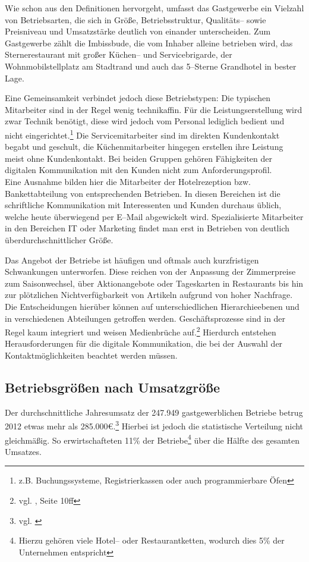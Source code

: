 Wie schon aus den Definitionen hervorgeht, umfasst das Gastgewerbe ein Vielzahl von Betriebsarten, die sich in Größe, Betriebsstruktur, Qualitäts– sowie Preisniveau und Umsatzstärke deutlich von einander unterscheiden. Zum Gastgewerbe zählt die Imbissbude, die vom Inhaber alleine betrieben wird, das Sternerestaurant mit großer Küchen– und Servicebrigarde, der Wohnmobilstellplatz am Stadtrand und auch das 5–Sterne Grandhotel in bester Lage.

Eine Gemeinsamkeit verbindet jedoch diese Betriebstypen: Die typischen Mitarbeiter sind in der Regel wenig technikaffin. Für die Leistungserstellung wird zwar Technik benötigt, diese wird jedoch vom Personal lediglich bedient und nicht eingerichtet.\footnote{z.B. Buchungssysteme, Registrierkassen oder auch programmierbare Öfen} Die Servicemitarbeiter sind im direkten Kundenkontakt begabt und geschult, die Küchenmitarbeiter hingegen erstellen ihre Leistung meist ohne Kundenkontakt. Bei beiden Gruppen gehören Fähigkeiten der digitalen Kommunikation mit den Kunden nicht zum Anforderungsprofil.\\
Eine Ausnahme bilden hier die Mitarbeiter der Hotelrezeption bzw. Bankettabteilung von entsprechenden Betrieben. In diesen Bereichen ist die schriftliche Kommunikation mit Interessenten und Kunden durchaus üblich, welche heute überwiegend per E–Mail abgewickelt wird. 
Spezialisierte Mitarbeiter in den Bereichen IT oder Marketing findet man erst in Betrieben von deutlich überdurchschnittlicher Größe. 

Das Angebot der Betriebe ist häufigen und oftmals auch kurzfristigen Schwankungen unterworfen. Diese reichen von der Anpassung der Zimmerpreise zum Saisonwechsel, über Aktionangebote oder Tageskarten in Restaurants bis hin zur plötzlichen Nichtverfügbarkeit von Artikeln aufgrund von hoher Nachfrage. Die Entscheidungen hierüber können auf unterschiedlichen Hierarchieebenen und in verschiedenen Abteilungen getroffen werden. Geschäftsprozesse sind in der Regel kaum integriert und weisen Medienbrüche auf.\footnote{vgl. \cite{waidele:integration}, Seite 10ff} Hierdurch entstehen Herausforderungen für die digitale Kommunikation, die bei der Auswahl der Kontaktmöglichkeiten beachtet werden müssen.

\subsection{Betriebsgrößen nach Umsatzgröße}

Der durchschnittliche Jahresumsatz der 247.949 gastgewerblichen Betriebe betrug 2012 etwas mehr als 285.000€.\footnote{vgl. \cite{destatis:genesis}} Hierbei ist jedoch die statistische Verteilung nicht gleichmäßig. So erwirtschafteten 11\% der Betriebe\footnote{Hierzu gehören viele Hotel– oder Restaurantketten, wodurch dies 5\% der Unternehmen entspricht} über die Hälfte des gesamten Umsatzes.

